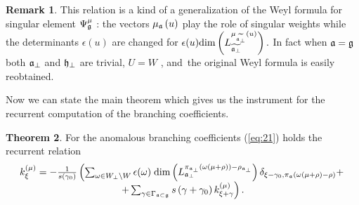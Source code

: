 \documentclass[12pt]{iopart}
\theoremstyle{definition}
\newtheorem{theorem}{Theorem}
\theoremstyle{definition}
\theoremstyle{definition}
\theoremstyle{definition}
\newtheorem{remark}[theorem]{Remark}
\begin{document}
\begin{remark}
This relation is a kind of a generalization of the Weyl formula for singular
element $\Psi _{\frak{g}}^{\mu }$ : the vectors $\mu _{\frak{a}}\left(
u\right) $ play the role of singular weights while the determinants $%
\epsilon (u)$ are changed for $\epsilon (u)\mathrm{\dim }\left( L_{%
\widetilde{\frak{a}_{\perp }}}^{\mu _{\widetilde{\frak{a}_{\perp }}}\left(
u\right) }\right) .$ In fact when $\frak{a=g}$ both $\frak{a}_{\perp }$ and $%
\frak{h}_{\perp }$ are trivial, $U=W$ , and\ the original Weyl formula is
easily reobtained.
\end{remark}
Now we can state the main theorem which gives us the instrument for the
recurrent computation of the branching coefficients.
\begin{theorem}
  For the anomalous branching coefficients (\ref{eq:21}) holds the recurrent relation
  \begin{equation}
    \label{eq:1}
    \label{recurrent-relation}
    \begin{array}{c}
      k_{\xi }^{\left( \mu \right) }=-\frac{1}{s\left( \gamma _{0}\right) }\left(
        \sum_{\omega\in W_{\bot}\backslash W} \epsilon(\omega)\;
        {\rm dim}\left(L^{\pi_{\mathfrak{a}_{\bot}}(\omega(\mu+\rho))-\rho_{\mathfrak{a}_{\bot}}}_{\mathfrak{a}_{\bot}}\right)
        \delta_{\xi-\gamma_0,\pi_{\mathfrak{a}}(\omega(\mu+\rho)-\rho)}+ \right.\\
      \left.
        +\sum_{\gamma \in
          \Gamma _{\frak{a}\subset \frak{g}}}s\left( \gamma +\gamma _{0}\right) k_{\xi
          +\gamma }^{\left( \mu \right) }\right).
    \end{array}
  \end{equation}


\end{theorem}
\end{document}
